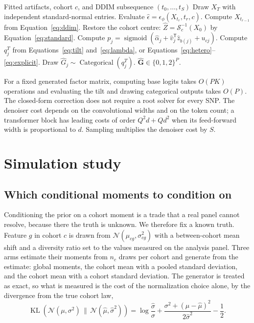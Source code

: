 \documentclass[11pt,a4paper]{article}
\newcommand{\KL}{\operatorname{KL}}
\newcommand{\sigmoid}{\operatorname{sigmoid}}
\newcommand{\Cat}{\operatorname{Categorical}}
\newcommand{\Normal}{\mathcal{N}}
\begin{document}
\begin{algorithm}[t]
\caption{Conditional genotype generation}
\label{alg:sample}
\begin{algorithmic}[1]
\Require Fitted artifacts, cohort $c$, and DDIM subsequence $(t_0,\ldots,t_S)$
\State Draw $X_T$ with independent standard-normal entries.
 \State Evaluate $\widehat\epsilon=\epsilon_\phi(X_{t_r},t_r,c)$.
 \State Compute $X_{t_{r-1}}$ from Equation~\eqref{eq:ddim}.
\EndFor
\State Restore the cohort centre: $\widehat Z=\mathcal S_c^{-1}(X_0)$ by Equation~\eqref{eq:standard}.
 \State Compute $p_j=\sigmoid(\widehat\alpha_j+
                  \widehat v_j^{\mathsf T}\widehat z_{b(j)}+u_{cj})$.
 \State Compute $q^T_j$ from Equations~\eqref{eq:tilt} and~\eqref{eq:lambda},
        or Equations~\eqref{eq:hetero}--\eqref{eq:explicit}.
 \State Draw $\widehat G_j\sim\Cat(q^T_j)$.
\EndFor
\State \Return $\widehat{\mathbf G}\in\{0,1,2\}^P$.
\end{algorithmic}
\end{algorithm}

For a fixed generated factor matrix, computing base logits takes $O(PK)$
operations and evaluating the tilt and drawing categorical outputs takes
$O(P)$. The closed-form correction does not require a root solver for every
SNP. The denoiser cost depends on the convolutional widths and on the token
count; a transformer block has leading costs of order $Q^2d+Qd^2$ when its
feed-forward width is proportional to $d$. Sampling multiplies the denoiser
cost by $S$.

\section{Simulation study}
\label{sec:simulation}

\subsection{Which conditional moments to condition on}
\label{sec:sim-moments}

Conditioning the prior on a cohort moment is a trade that a real panel cannot
resolve, because there the truth is unknown. We therefore fix a known truth.
Feature $g$ in cohort $c$ is drawn from $\Normal(\mu_{cg},\sigma_{cg}^2)$ with
a between-cohort mean shift and a diversity ratio set to the values measured on
the analysis panel. Three arms estimate their moments from $n_c$ draws per
cohort and generate from the estimate: global moments, the cohort mean with a
pooled standard deviation, and the cohort mean with a cohort standard
deviation. The generator is treated as exact, so what is measured is the cost
of the normalization choice alone, by the divergence from the true cohort law,
\begin{equation}
 \KL\!\left(\Normal(\mu,\sigma^2)\,\|\,\Normal(\widehat\mu,\widehat\sigma^2)\right)
 =\log\frac{\widehat\sigma}{\sigma}
  +\frac{\sigma^2+(\mu-\widehat\mu)^2}{2\widehat\sigma^2}-\frac12 .
 \label{eq:simkl}
\end{equation}
\end{document}
